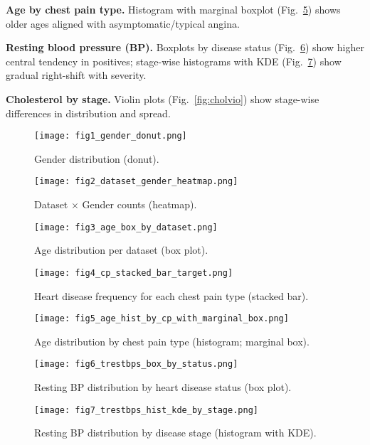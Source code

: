 \documentclass[conference]{IEEEtran}
\begin{document}
\textbf{Age by chest pain type.} Histogram with marginal boxplot (Fig.~\ref{fig:agecp}) shows older ages aligned with asymptomatic/typical angina.

\textbf{Resting blood pressure (BP).} Boxplots by disease status (Fig.~\ref{fig:bpbox}) show higher central tendency in positives; stage-wise histograms with KDE (Fig.~\ref{fig:bphist}) show gradual right-shift with severity.

\textbf{Cholesterol by stage.} Violin plots (Fig.~\ref{fig:cholvio}) show stage-wise differences in distribution and spread.

\begin{figure}[!t]
  \centering
  \texttt{[image: fig1\_gender\_donut.png]}
  \caption{Gender distribution (donut).}
  \label{fig:gender}
\end{figure}

\begin{figure}[!t]
  \centering
  \texttt{[image: fig2\_dataset\_gender\_heatmap.png]}
  \caption{Dataset $\times$ Gender counts (heatmap).}
  \label{fig:heatmap}
\end{figure}

\begin{figure}[!t]
  \centering
  \texttt{[image: fig3\_age\_box\_by\_dataset.png]}
  \caption{Age distribution per dataset (box plot).}
  \label{fig:agebox}
\end{figure}

\begin{figure}[!t]
  \centering
  \texttt{[image: fig4\_cp\_stacked\_bar\_target.png]}
  \caption{Heart disease frequency for each chest pain type (stacked bar).}
  \label{fig:cpstack}
\end{figure}

\begin{figure}[!t]
  \centering
  \texttt{[image: fig5\_age\_hist\_by\_cp\_with\_marginal\_box.png]}
  \caption{Age distribution by chest pain type (histogram; marginal box).}
  \label{fig:agecp}
\end{figure}

\begin{figure}[!t]
  \centering
  \texttt{[image: fig6\_trestbps\_box\_by\_status.png]}
  \caption{Resting BP distribution by heart disease status (box plot).}
  \label{fig:bpbox}
\end{figure}

\begin{figure}[!t]
  \centering
  \texttt{[image: fig7\_trestbps\_hist\_kde\_by\_stage.png]}
  \caption{Resting BP distribution by disease stage (histogram with KDE).}
  \label{fig:bphist}
\end{figure}
\end{document}
